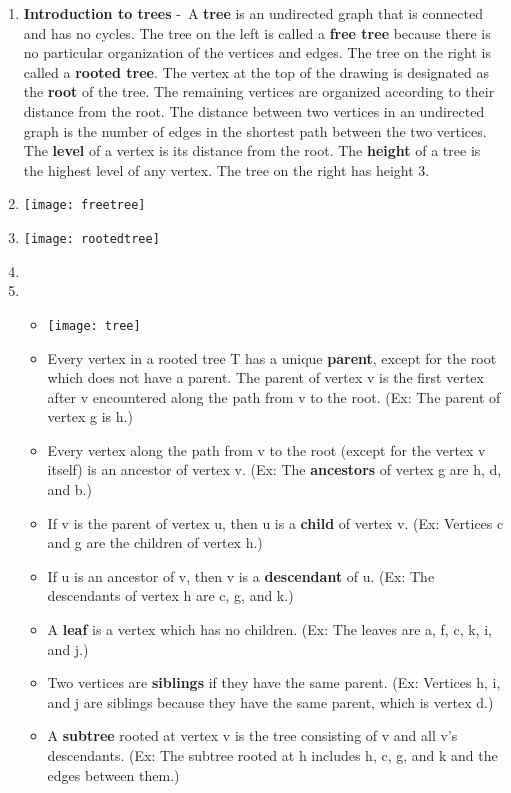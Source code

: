 \documentclass[12pt,a4paper]{article}
\begin{document}
\begin{enumerate}
  \item \textbf{Introduction to trees} -\ A \textbf{tree} is an undirected graph that is connected and has no cycles.
  The tree on the left is called a \textbf{free tree} because there is no particular organization of the vertices and edges. The tree on the right is called a \textbf{rooted tree}. The vertex at the top of the drawing is designated as the \textbf{root} of the tree. The remaining vertices are organized according to their distance from the root. The distance between two vertices in an undirected graph is the number of edges in the shortest path between the two vertices. The \textbf{level} of a vertex is its distance from the root. The \textbf{height} of a tree is the highest level of any vertex. The tree on the right has height 3.
  \item[] \texttt{[image: freetree]}
  \item[] \texttt{[image: rootedtree]}
  \item[] 
  \item[] 
  \begin{itemize}
    \item[] \texttt{[image: tree]}
    \item Every vertex in a rooted tree T has a unique \textbf{parent}, except for the root which does not have a parent. The parent of vertex v is the first vertex after v encountered along the path from v to the root. (Ex: The parent of vertex g is h.) 
    \item Every vertex along the path from v to the root (except for the vertex v itself) is an ancestor of vertex v. (Ex: The \textbf{ancestors} of vertex g are h, d, and b.)
    \item If v is the parent of vertex u, then u is a \textbf{child} of vertex v. (Ex: Vertices c and g are the children of vertex h.)
    \item If u is an ancestor of v, then v is a \textbf{descendant} of u. (Ex: The descendants of vertex h are c, g, and k.)
    \item A \textbf{leaf} is a vertex which has no children. (Ex: The leaves are a, f, c, k, i, and j.)
    \item Two vertices are \textbf{siblings} if they have the same parent. (Ex: Vertices h, i, and j are siblings because they have the same parent, which is vertex d.)
    \item A \textbf{subtree} rooted at vertex v is the tree consisting of v and all v's descendants. (Ex: The subtree rooted at h includes h, c, g, and k and the edges between them.)

\end{itemize}
\end{enumerate}
\end{document}
